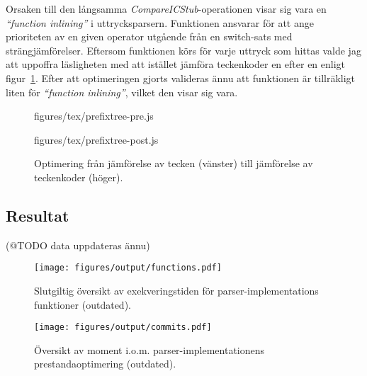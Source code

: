 Orsaken till den långsamma \textit{CompareICStub}-operationen visar sig vara
en \textit{``function inlining''} i uttrycksparsern. Funktionen ansvarar för
att ange prioriteten av en given operator utgående från en switch-sats
med strängjämförelser. Eftersom funktionen körs för varje uttryck som hittas
valde jag att uppoffra läsligheten med att istället jämföra teckenkoder en
efter en enligt figur~\ref{fig:switchtree}. Efter att optimeringen
gjorts valideras ännu att funktionen är tillräkligt liten för
\textit{``function inlining''}, vilket den visar sig vara.

\begin{figure}[ht]
  \begin{minipage}[t]{0.5\textwidth}
      {figures/tex/prefixtree-pre.js}
  \end{minipage}%
  \begin{minipage}[t]{0.5\textwidth}
      {figures/tex/prefixtree-post.js}
  \end{minipage}
  \caption{Optimering från jämförelse av tecken (vänster) till jämförelse av teckenkoder (höger).}
  \label{fig:switchtree}
\end{figure}

\subsection{Resultat}

(@TODO data uppdateras ännu)

\begin{figure}[ht]
  \texttt{[image: figures/output/functions.pdf]}
  \caption{Slutgiltig översikt av exekveringstiden för parser-implementations
    funktioner (outdated).}
\end{figure}

\begin{figure}[ht]
  \texttt{[image: figures/output/commits.pdf]}
  \caption{Översikt av moment i.o.m. parser-implementationens
    prestandaoptimering (outdated).}
\end{figure}

